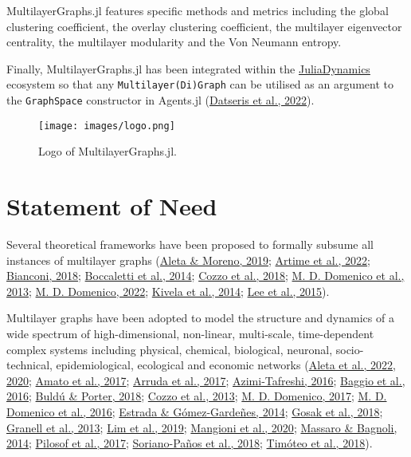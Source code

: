 \documentclass[
]{article}
\begin{document}
MultilayerGraphs.jl features specific methods and metrics including the
global clustering coefficient, the overlay clustering coefficient, the
multilayer eigenvector centrality, the multilayer modularity and the Von
Neumann entropy.

Finally, MultilayerGraphs.jl has been integrated within the
\href{https://github.com/JuliaDynamics}{JuliaDynamics} ecosystem so that
any \texttt{Multilayer(Di)Graph} can be utilised as an argument to the
\texttt{GraphSpace} constructor in Agents.jl
(\protect\hyperlink{ref-Datseris2022}{Datseris et al., 2022}).

\begin{figure}
\centering
\texttt{[image: images/logo.png]}
\caption{Logo of MultilayerGraphs.jl. \label{fig:logo}}
\end{figure}

\hypertarget{statement-of-need}{%
\section{Statement of Need}\label{statement-of-need}}

Several theoretical frameworks have been proposed to formally subsume
all instances of multilayer graphs
(\protect\hyperlink{ref-Aleta2019}{Aleta \& Moreno, 2019};
\protect\hyperlink{ref-Artime2022}{Artime et al., 2022};
\protect\hyperlink{ref-Bianconi2018}{Bianconi, 2018};
\protect\hyperlink{ref-Boccaletti2014}{Boccaletti et al., 2014};
\protect\hyperlink{ref-Cozzo2018}{Cozzo et al., 2018};
\protect\hyperlink{ref-DeDomenico2013}{M. D. Domenico et al., 2013};
\protect\hyperlink{ref-DeDomenico2022}{M. D. Domenico, 2022};
\protect\hyperlink{ref-Kivela2014}{Kivela et al., 2014};
\protect\hyperlink{ref-Lee2015}{Lee et al., 2015}).

Multilayer graphs have been adopted to model the structure and dynamics
of a wide spectrum of high-dimensional, non-linear, multi-scale,
time-dependent complex systems including physical, chemical, biological,
neuronal, socio-technical, epidemiological, ecological and economic
networks (\protect\hyperlink{ref-Aleta2022}{Aleta et al., 2022},
\protect\hyperlink{ref-Aleta2020}{2020};
\protect\hyperlink{ref-Amato2017}{Amato et al., 2017};
\protect\hyperlink{ref-deArruda2017}{Arruda et al., 2017};
\protect\hyperlink{ref-AzimiTafreshi2016}{Azimi-Tafreshi, 2016};
\protect\hyperlink{ref-Baggio2016}{Baggio et al., 2016};
\protect\hyperlink{ref-Buldu2018}{Buldú \& Porter, 2018};
\protect\hyperlink{ref-Cozzo2013}{Cozzo et al., 2013};
\protect\hyperlink{ref-DeDomenico2017}{M. D. Domenico, 2017};
\protect\hyperlink{ref-DeDomenico2016}{M. D. Domenico et al., 2016};
\protect\hyperlink{ref-Estrada2014}{Estrada \& Gómez-Gardeñes, 2014};
\protect\hyperlink{ref-Gosak2018}{Gosak et al., 2018};
\protect\hyperlink{ref-Granell2013}{Granell et al., 2013};
\protect\hyperlink{ref-Lim2019}{Lim et al., 2019};
\protect\hyperlink{ref-Mangioni2020}{Mangioni et al., 2020};
\protect\hyperlink{ref-Massaro2014}{Massaro \& Bagnoli, 2014};
\protect\hyperlink{ref-Pilosof2017}{Pilosof et al., 2017};
\protect\hyperlink{ref-SorianoPaos2018}{Soriano-Paños et al., 2018};
\protect\hyperlink{ref-Timteo2018}{Timóteo et al., 2018}).
\end{document}
